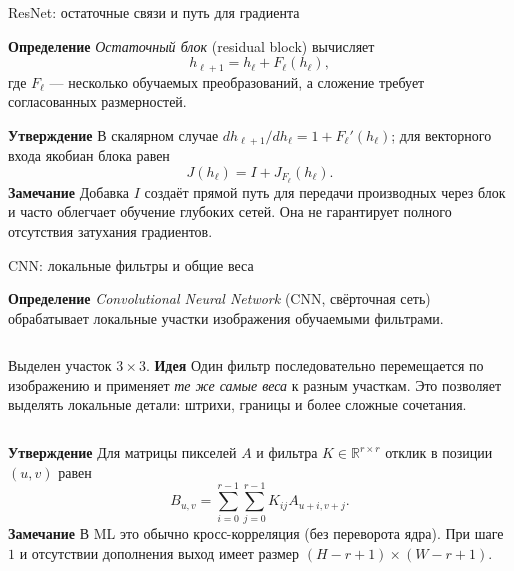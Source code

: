 \documentclass[10pt]{beamer}
\newcommand{\mlBody}{\normalsize}
\newcommand{\mlDefinition}{\textcolor{defblue}{\bfseries Определение}}
\newcommand{\mlStatement}{\textcolor{defblue}{\bfseries Утверждение}}
\newcommand{\mlRemark}{\textcolor{defblue}{\bfseries Замечание}}
\newcommand{\mlIdea}{\textcolor{defblue}{\bfseries Идея}}
\begin{document}
\begin{frame}{ResNet: остаточные связи и путь для градиента}

\mlBody
\mlDefinition\; \textit{Остаточный блок} (residual block) вычисляет
\[
 \boxed{h_{\ell+1}=h_\ell+F_\ell(h_\ell)},
\]
где $F_\ell$ --- несколько обучаемых преобразований, а сложение требует согласованных размерностей.
\begin{center}
\end{center}
\mlStatement\; В скалярном случае $dh_{\ell+1}/dh_\ell=1+F_\ell'(h_\ell)$;
для векторного входа якобиан блока равен
\[
 \boxed{J(h_\ell)=I+J_{F_\ell}(h_\ell)}.
\]
\mlRemark\; Добавка $I$ создаёт прямой путь для передачи производных через блок и часто облегчает обучение глубоких сетей. Она не гарантирует полного отсутствия затухания градиентов.
\end{frame}

\begin{frame}{CNN: локальные фильтры и общие веса}

\mlBody
\mlDefinition\; \textit{Convolutional Neural Network} (CNN, свёрточная сеть) обрабатывает локальные участки изображения обучаемыми фильтрами.
\begin{columns}[c,onlytextwidth]
    \centering
    \par\smallskip
    {\small Выделен участок $3\times3$.}
    \mlIdea\; Один фильтр последовательно перемещается по изображению и применяет \emph{те же самые веса} к разным участкам.
    \vspace{0.18cm}
    Это позволяет выделять локальные детали: штрихи, границы и более сложные сочетания.
\end{columns}
\vspace{0.12cm}
\mlStatement\; Для матрицы пикселей $A$ и фильтра $K\in\mathbb R^{r\times r}$ отклик в позиции $(u,v)$ равен
\[
 \boxed{B_{u,v}=\sum_{i=0}^{r-1}\sum_{j=0}^{r-1} K_{ij}A_{u+i,v+j}}.
\]
\mlRemark\; В ML это обычно кросс-корреляция (без переворота ядра). При шаге $1$ и отсутствии дополнения выход имеет размер $(H-r+1)\times(W-r+1)$.
\end{frame}
\end{document}
